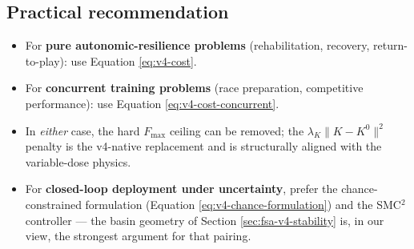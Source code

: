\subsection{Practical recommendation}

\begin{itemize}
  \item For \textbf{pure autonomic-resilience problems} (rehabilitation, recovery, return-to-play): use Equation \ref{eq:v4-cost}.
  \item For \textbf{concurrent training problems} (race preparation, competitive performance): use Equation \ref{eq:v4-cost-concurrent}.
  \item In \emph{either} case, the hard $F_{\max}$ ceiling can be removed; the $\lambda_K \|K - K^0\|^2$ penalty is the v4-native replacement and is structurally aligned with the variable-dose physics.
  \item For \textbf{closed-loop deployment under uncertainty}, prefer the chance-constrained formulation (Equation \ref{eq:v4-chance-formulation}) and the SMC$^2$ controller --- the basin geometry of Section \ref{sec:fsa-v4-stability} is, in our view, the strongest argument for that pairing.
\end{itemize}
